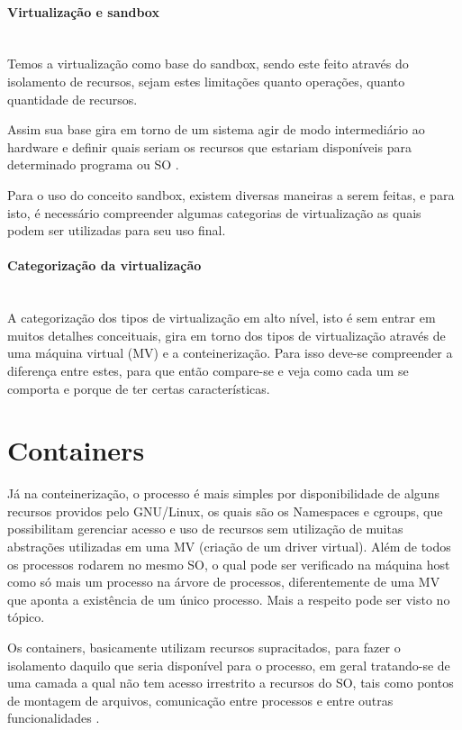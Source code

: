 \paragraph*{Virtualização e sandbox}\mbox{}\\
Temos a virtualização como base do sandbox, sendo este feito através do isolamento de recursos, sejam estes limitações quanto operações, quanto quantidade de recursos.

Assim sua base gira em torno de um sistema agir de modo intermediário ao hardware e definir quais seriam os recursos que estariam disponíveis para determinado programa ou SO \cite{linux-containers-virtualization}.

Para o uso do conceito sandbox, existem diversas maneiras a serem feitas, e para isto, é necessário compreender algumas categorias de virtualização as quais podem ser utilizadas para seu uso final.

\paragraph*{Categorização da virtualização}\mbox{}\\
A categorização dos tipos de virtualização em alto nível, isto é sem entrar em muitos detalhes conceituais, gira em torno dos tipos de virtualização através de uma máquina virtual (MV) e a conteinerização. Para isso deve-se compreender a diferença entre estes, para que então compare-se e veja como cada um se comporta e porque de ter certas características.



\section{Containers}
\label{chp:referencial_teorico::sct:containers}
Já na conteinerização, o processo é mais simples por disponibilidade de alguns recursos providos pelo GNU/Linux, os quais são os Namespaces e cgroups, que possibilitam gerenciar acesso e uso de recursos sem utilização de muitas abstrações utilizadas em uma MV (criação de um driver virtual). Além de todos os processos rodarem no mesmo SO, o qual pode ser verificado na máquina host como só mais um processo na árvore de processos, diferentemente de uma MV que aponta a existência de um único processo. Mais a respeito pode ser visto no tópico.

Os containers, basicamente utilizam recursos supracitados, para fazer o isolamento daquilo que seria disponível para o processo, em geral tratando-se de uma camada a qual não tem acesso irrestrito a recursos do SO, tais como pontos de montagem de arquivos, comunicação entre processos e entre outras funcionalidades \cite{what-container, what-are-container}.


